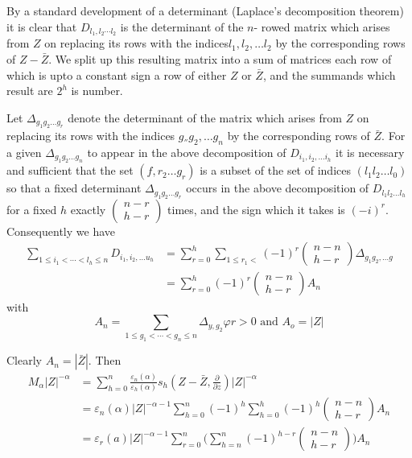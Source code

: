 By a standard development of a determinant (Laplace's decomposition
theorem) it is clear that $D_{l_1, l_2 \cdots l_2}$ is the determinant
of the $n$- rowed matrix which arises from $Z$ on replacing its
rows with the indices\break $l_1, l_2, \ldots l_2$ by the corresponding rows
of $Z - \bar{Z}$. We split up this resulting matrix into a sum of
\pageoriginale matrices each row of which is upto a constant sign a
row of either $Z$ or $\bar{Z}$, and the summands which result are
$2^h$ is number.  

Let $\Delta_{g_1 g_2 \ldots g_r}$ denote the determinant of the matrix
which arises from $Z$ on replacing its rows with the indices $g_{''}
g_2, \ldots g_n$ by the corresponding rows of $\bar{Z}$. For a given
$\Delta_{g_1 g_2 \ldots g_n}$ to appear in the above decomposition of
$D_{i_1, i_2,\ldots i_h}$ it is necessary and sufficient that the
set $(f, r_2 \ldots 
g_r)$ is a subset of the set of indices $(l_1 l_2 \ldots l_0)$ so that
a fixed determinant $\Delta_{g_1 g_2 \ldots g_r}$ occurs in the
above decomposition of $D_{l_1 l_2 \ldots l_h}$ for a fixed $h$ exactly
$\begin{pmatrix} n- r \\ h - r \end{pmatrix}$ times, and the sign
which it takes is $(-i)^r$. Consequently we have 
\begin{align*}
\sum_{1 \le i_1 < \cdots < l_h \le n} D_{i_1,i_2, \ldots u_h} & = \sum^h_{r = 0}
\sum_{1 \le r_1 <} (-1)^r \begin{pmatrix} n-n \\h -r \end{pmatrix}
\Delta_{g_1 g_2, \ldots g}\\ 
& = \sum_{r =0}^h (-1)^r \begin{pmatrix} n-n \\h -r \end{pmatrix} A_n 
\end{align*}
with
$$
A_n = \sum_{1 \le g_1 < \cdots < g_n \le n} \Delta_{y, g_2}
\varphi r > 0 \text{ and } A_o = |Z| 
$$

Clearly $A_n = |\bar{Z}|$. Then
\begin{align*}
M_\alpha |Z|^{- \alpha} & = \sum^n_{h = 0} \frac{\varepsilon_n
  (\alpha)}{\varepsilon_h (\alpha)} s_h (Z - \bar{Z} ,
\frac{\partial}{\partial z}) |Z|^{- \alpha}\\ 
& = \varepsilon_n (\alpha) |Z|^{- \alpha -1} \sum^{n}_{h  =0} (-1)^h
\sum^h_{h = 0} (-1)^h \begin{pmatrix} n-n \\h -r \end{pmatrix} A_n\\ 
& = \varepsilon_r (a) |Z|^{- \alpha - 1} \sum^n_{r = 0}
\Bigg(\sum^{n}_{h = n} (-1)^{ h - r}
\begin{pmatrix}
n-n \\
h -r 
\end{pmatrix} \Bigg)A_n 
\end{align*}

